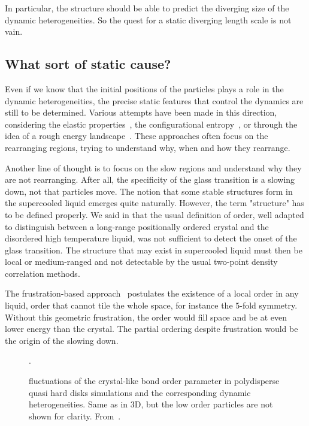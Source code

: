 In particular, the structure should be able to predict the diverging size of the dynamic heterogeneities. So the quest for a static diverging length scale is not vain.

\subsection{What sort of static cause?}

Even if we know that the initial positions of the particles plays a role in the dynamic heterogeneities, the precise static features that control the dynamics are still to be determined. Various attempts have been made in this direction, considering the elastic properties~\citep{Brito2006, Widmer-Cooper2008, Tsamados2009}, the configurational entropy~\citep{adam1965tdr, Kirkpatrick1987a, Kirkpatrick1987, kirkpatrick1989scd}, or through the idea of a rough energy landscape~\citep{Stillinger1984}. These approaches often focus on the rearranging regions, trying to understand why, when and how they rearrange.

Another line of thought is to focus on the slow regions and understand why they are not rearranging. After all, the specificity of the glass transition is a slowing down, not that particles move. The notion that some stable structures form in the supercooled liquid emerges quite naturally. However, the term "structure" has to be defined properly. We said in  that the usual definition of order, well adapted to distinguish between a long-range positionally ordered crystal and the disordered high temperature liquid, was not sufficient to detect the onset of the glass transition. The structure that may exist in supercooled liquid must then be local or medium-ranged and not detectable by the usual two-point density correlation methods.

The frustration-based approach~\citep{tarjus2005fba} postulates the existence of a local order in any liquid, order that cannot tile the whole space, for instance the $5$-fold symmetry. Without this geometric frustration, the order would fill space and be at even lower energy than the crystal. The partial ordering despite frustration would be the origin of the slowing down.

\begin{figure}
	\centering
	\caption{ fluctuations of the crystal-like bond order parameter in polydisperse quasi hard disks simulations and  the corresponding dynamic heterogeneities.  Same as  in 3D, but the low order particles are not shown for clarity. From~\citep{tanaka2010critical}.}.
	\label{fig:kawa_nm}
\end{figure}

